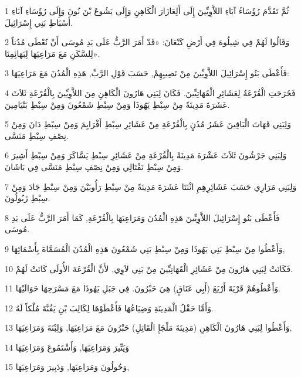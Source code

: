 \par 1 ثُمَّ تَقَدَّمَ رُؤَسَاءُ آبَاءِ اللاَّوِيِّينَ إِلَى أَلِعَازَارَ الْكَاهِنِ وَإِلَى يَشُوعَ بْنَ نُونَ وَإِلَى رُؤَسَاءِ آبَاءِ أَسْبَاطِ بَنِي إِسْرَائِيلَ.
\par 2 وَقَالُوا لَهُمْ فِي شِيلُوهَ فِي أَرْضِ كَنْعَانَ: «قَدْ أَمَرَ الرَّبُّ عَلَى يَدِ مُوسَى أَنْ نُعْطَى مُدُناً لِلسَّكَنِ مَعَ مَرَاعِيَهَا لِبَهَائِمِنَا».
\par 3 فَأَعْطَى بَنُو إِسْرَائِيلَ اللاَّوِيِّينَ مِنْ نَصِيبِهِمْ, حَسَبَ قَوْلِ الرَّبِّ, هَذِهِ الْمُدُنَ مَعَ مَرَاعِيَهَا:
\par 4 فَخَرَجَتِ الْقُرْعَةُ لِعَشَائِرِ الْقَهَاتِيِّينَ. فَكَانَ لِبَنِي هَارُونَ الْكَاهِنِ مِنَ اللاَّوِيِّينَ بِالْقُرْعَةِ ثَلاَثَ عَشَرَةَ مَدِينَةً مِنْ سِبْطِ يَهُوذَا وَمِنْ سِبْطِ شَمْعُونَ وَمِنْ سِبْطِ بَنْيَامِينَ.
\par 5 وَلِبَنِي قَهَاتَ الْبَاقِينَ عَشَرُ مُدُنٍ بِالْقُرْعَةِ مِنْ عَشَائِرِ سِبْطِ أَفْرَايِمَ وَمِنْ سِبْطِ دَانَ وَمِنْ نِصْفِ سِبْطِ مَنَسَّى.
\par 6 وَلِبَنِي جَرْشُونَ ثَلاَثَ عَشْرَةَ مَدِينَةً بِالْقُرْعَةِ مِنْ عَشَائِرِ سِبْطِ يَسَّاكَرَ وَمِنْ سِبْطِ أَشِيرَ وَمِنْ سِبْطِ نَفْتَالِي وَمِنْ نِصْفِ سِبْطِ مَنَسَّى فِي بَاشَانَ.
\par 7 وَلِبَنِي مَرَارِي حَسَبَ عَشَائِرِهِمِ اثْنَتَا عَشَرَةَ مَدِينَةً مِنْ سِبْطِ رَأُوبَيْنَ وَمِنْ سِبْطِ جَادَ وَمِنْ سِبْطِ زَبُولُونَ.
\par 8 فَأَعْطَى بَنُو إِسْرَائِيلَ اللاَّوِيِّينَ هَذِهِ الْمُدُنَ وَمَرَاعِيَهَا بِالْقُرْعَةِ, كَمَا أَمَرَ الرَّبُّ عَلَى يَدِ مُوسَى.
\par 9 وَأَعْطُوا مِنْ سِبْطِ بَنِي يَهُوذَا وَمِنْ سِبْطِ بَنِي شَمْعُونَ هَذِهِ الْمُدُنَ الْمُسَمَّاةَ بِأَسْمَائِهَا,
\par 10 فَكَانَتْ لِبَنِي هَارُونَ مِنْ عَشَائِرِ الْقَهَاتِيِّينَ مِنْ بَنِي لاَوِي, لأَنَّ الْقُرْعَةَ الأُولَى كَانَتْ لَهُمْ.
\par 11 وَأَعْطُوهُمْ قَرْيَةَ أَرْبَعَ (أَبِي عَنَاقٍ) هِيَ حَبْرُونَ. فِي جَبَلِ يَهُوذَا مَعَ مَسْرَحِهَا حَوَالَيْهَا.
\par 12 وَأَمَّا حَقْلُ الْمَدِينَةِ وَضِيَاعُهَا فَأَعْطَوْهَا لِكَالِبَ بْنِ يَفُنَّةَ مُلْكاً لَهُ.
\par 13 وَأَعْطُوا لِبَنِي هَارُونَ الْكَاهِنِ (مَدِينَةَ مَلْجَإِ الْقَاتِلِ) حَبْرُونَ مَعَ مَرَاعِيَهَا, وَلِبْنَةَ وَمَرَاعِيَهَا,
\par 14 وَيَتِّيرَ وَمَرَاعِيَهَا, وَأَشْتَمُوعَ وَمَرَاعِيَهَا
\par 15 وَحُولُونَ وَمَرَاعِيَهَا, وَدَبِيرَ وَمَرَاعِيَهَا,
